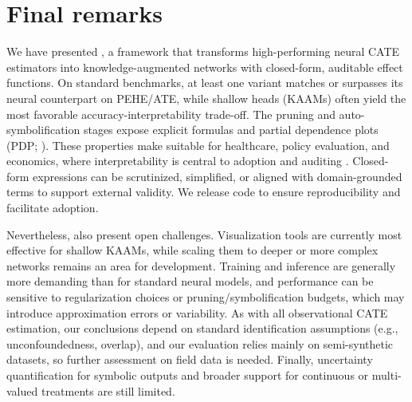 \section{Final remarks}
\label{sec:conclusion}

We have presented \ours, a framework that transforms high-performing neural CATE estimators into knowledge-augmented networks with closed-form, auditable effect functions. On standard benchmarks, at least one \our variant matches or surpasses its neural counterpart on PEHE/ATE, while shallow heads (KAAMs) often yield the most favorable accuracy-interpretability trade-off. The pruning and auto-symbolification stages expose explicit formulas and partial dependence plots (PDP; \citet{friedman2001greedy}). These properties make \ours suitable for healthcare, policy evaluation, and economics, where interpretability is central to adoption and auditing \citep{AmannBMC2020, TonekaboniMLHC2019, Rudin2018StopEB, DoshiVelez2017TowardsAR}. Closed-form expressions can be scrutinized, simplified, or aligned with domain-grounded terms to support external validity. We release code to ensure reproducibility and facilitate adoption.

Nevertheless, \ours also present open challenges. Visualization tools are currently most effective for shallow KAAMs, while scaling them to deeper or more complex networks remains an area for development. Training and inference are generally more demanding than for standard neural models, and performance can be sensitive to regularization choices or pruning/symbolification budgets, which may introduce approximation errors or variability. As with all observational CATE estimation, our conclusions depend on standard identification assumptions (e.g., unconfoundedness, overlap), and our evaluation relies mainly on semi-synthetic datasets, so further assessment on field data is needed. Finally, uncertainty quantification for symbolic outputs and broader support for continuous or multi-valued treatments are still limited.

